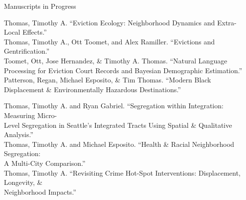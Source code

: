 \documentclass{resume} %
\begin{document}
\begin{rSection}{Manuscripts in Progress}
\vspace{5mm}

Thomas, Timothy A. ``Eviction Ecology: Neighborhood Dynamics and Extra-Local Effects.''\\

Thomas, Timothy A., Ott Toomet, and Alex Ramiller. ``Evictions and Gentrification.''\\

Toomet, Ott, Jose Hernandez, \& Timothy A. Thomas. ``Natural
Language Processing for Eviction Court Records and Bayesian Demographic Estimation.''\\

Patterson, Regan, Michael Esposito, \& Tim Thomas. ``Modern Black Displacement \& Environmentally Hazardous Destinations.''

Thomas, Timothy A. and Ryan Gabriel. ``Segregation within Integration: Measuring Micro-\\
Level Segregation in Seattle’s Integrated Tracts Using Spatial \& Qualitative Analysis.''\\

Thomas, Timothy A. and Michael Esposito. ``Health \& Racial Neighborhood Segregation: \\
A Multi-City Comparison.''\\

Thomas, Timothy A. ``Revisiting Crime Hot-Spot Interventions: Displacement, Longevity, \& \\
Neighborhood Impacts.''
\vspace{5mm}
\end{rSection}

%
%
\end{document}
